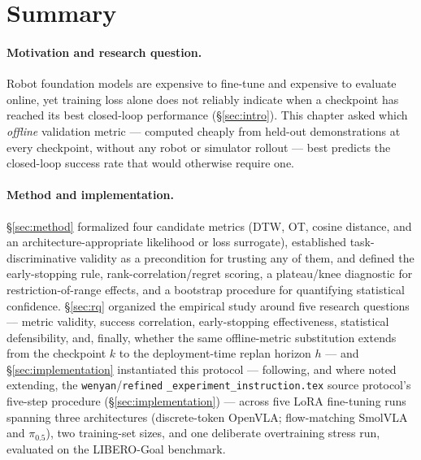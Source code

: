 \documentclass[english,12pt,a4paper,pdftex,elec,utf8]{aaltothesis}
\begin{document}
\section{Summary}
\label{sec:summary}

\paragraph{Motivation and research question.} Robot foundation models are expensive to fine-tune and expensive to evaluate online, yet training loss alone does not reliably indicate when a checkpoint has reached its best closed-loop performance (\S\ref{sec:intro}). This chapter asked which \emph{offline} validation metric --- computed cheaply from held-out demonstrations at every checkpoint, without any robot or simulator rollout --- best predicts the closed-loop success rate that would otherwise require one.

\paragraph{Method and implementation.} \S\ref{sec:method} formalized four candidate metrics (DTW, OT, cosine distance, and an architecture-appropriate likelihood or loss surrogate), established task-discriminative validity as a precondition for trusting any of them, and defined the early-stopping rule, rank-correlation/regret scoring, a plateau/knee diagnostic for restriction-of-range effects, and a
bootstrap procedure for quantifying statistical confidence. \S\ref{sec:rq} organized the empirical study around five research questions --- metric validity, success correlation, early-stopping effectiveness, statistical defensibility, and, finally, whether the same offline-metric substitution extends from the checkpoint $k$ to the deployment-time replan horizon $h$ --- and \S\ref{sec:implementation} instantiated this
protocol --- following, and where noted extending, the \texttt{wenyan}/\texttt{refined}
\texttt{\_experiment\_instruction.tex} source protocol's five-step procedure (\S\ref{sec:implementation}) --- across five LoRA
fine-tuning runs spanning three architectures (discrete-token OpenVLA; flow-matching SmolVLA and
$\pi_{0.5}$), two training-set sizes, and one deliberate overtraining stress run, evaluated on the
LIBERO-Goal benchmark.
\end{document}
